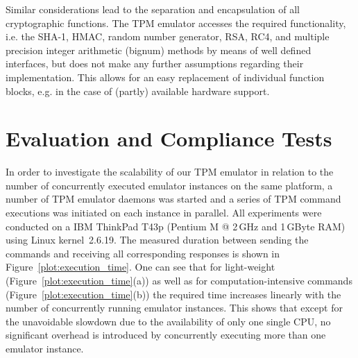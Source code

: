 \documentclass[runningheads]{llncs}
\begin{document}
Similar considerations lead to the separation and encapsulation of all
cryptographic functions. The TPM emulator accesses the required functionality,
i.e. the SHA-1, HMAC, random number generator, RSA, RC4, and multiple
precision integer arithmetic (bignum) methods by means of well defined
interfaces, but does not make any further assumptions regarding their
implementation. This allows for an easy replacement of individual function
blocks, e.g. in the case of (partly) available hardware support.


\section{Evaluation and Compliance Tests}\label{sec:state}
In order to investigate the scalability of our TPM emulator in relation to
the number of concurrently executed emulator instances on the same platform,
a number of TPM emulator daemons was started and a series of TPM command
executions was initiated on each instance in parallel. All experiments were
conducted on a IBM ThinkPad T43p (Pentium M @ 2\,GHz and 1\,GByte RAM) using
Linux kernel~2.6.19. The measured duration between sending the commands and
receiving all corresponding responses is shown in
Figure~\ref{plot:execution_time}. One can see that for light-weight
(Figure~\ref{plot:execution_time}(a)) as well as for computation-intensive
commands (Figure~\ref{plot:execution_time}(b)) the required time increases
linearly with the number of concurrently running emulator instances. This
shows that except for the unavoidable slowdown due to the availability of
only one single CPU, no significant overhead is introduced by concurrently
executing more than one emulator instance.

\end{document}
